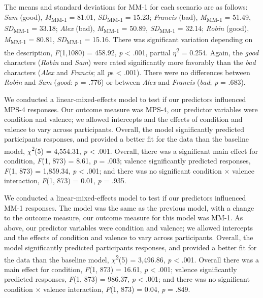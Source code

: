 \documentclass[
  english,
  man,floatsintext]{apa7}
\begin{document}
The means and standard deviations for MM-1 for each scenario are as follows:
\emph{Sam} (good),
\emph{M}\textsubscript{MM-1} = 81.01, \emph{SD}\textsubscript{MM-1} = 15.23;
\emph{Francis} (bad),
\emph{M}\textsubscript{MM-1} = 51.49, \emph{SD}\textsubscript{MM-1} = 33.18;
\emph{Alex} (bad),
\emph{M}\textsubscript{MM-1} = 50.89, \emph{SD}\textsubscript{MM-1} = 32.14;
\emph{Robin} (good),
\emph{M}\textsubscript{MM-1} = 80.81, \emph{SD}\textsubscript{MM-1} = 15.16. There was significant variation depending on the description, \emph{F}(1,1080) = 458.92, \emph{p} \textless{} .001, partial \(\eta\)\textsuperscript{2} = 0.254. Again, the \emph{good} characters (\emph{Robin} and \emph{Sam}) were rated significantly more favorably than the \emph{bad} characters (\emph{Alex} and \emph{Francis}; all \emph{p}s \textless{} .001). There were no differences between \emph{Robin} and \emph{Sam} (\emph{good}: \emph{p} = .776) or between \emph{Alex} and \emph{Francis} (\emph{bad}; \emph{p} = .683).

We conducted a linear-mixed-effects model to test if our predictors influenced MPS-4 responses. Our outcome measure was MPS-4, our predictor variables were condition and valence; we allowed intercepts and the effects of condition and valence to vary across participants.
Overall, the model significantly predicted participants responses, and provided a better fit for the data than the baseline model,
\(\chi\)\textsuperscript{2}(5) = 4,554.31, \emph{p} \textless{} .001.
Overall, there was a significant main effect for condition,
\emph{F}(1, 873) = 8.61, \emph{p} = .003;
valence significantly predicted responses,
\emph{F}(1, 873) = 1,859.34, \emph{p} \textless{} .001;
and there was no significant condition \(\times\) valence interaction,
\emph{F}(1, 873) = 0.01, \emph{p} = .935.

We conducted a linear-mixed-effects model to test if our predictors influenced MM-1 responses. The model was the same as the previous model, with a change to the outcome measure, our outcome measure for this model was MM-1. As above, our predictor variables were condition and valence; we allowed intercepts and the effects of condition and valence to vary across participants.
Overall, the model significantly predicted participants responses, and provided a better fit for the data than the baseline model,
\(\chi\)\textsuperscript{2}(5) = 3,496.86, \emph{p} \textless{} .001.
Overall there was a main effect for condition,
\emph{F}(1, 873) = 16.61, \emph{p} \textless{} .001;
valence significantly predicted responses,
\emph{F}(1, 873) = 986.37, \emph{p} \textless{} .001;
and there was no significant condition \(\times\) valence interaction,
\emph{F}(1, 873) = 0.04, \emph{p} = .849.
\end{document}
